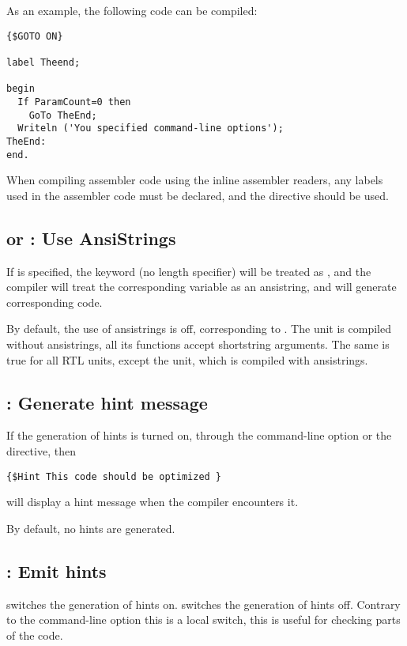 As an example, the following code can be compiled:
\begin{verbatim}
{$GOTO ON}

label Theend;

begin
  If ParamCount=0 then
    GoTo TheEnd;
  Writeln ('You specified command-line options');
TheEnd:
end.
\end{verbatim}

\begin{remark}When compiling assembler code using the inline assembler
readers, any labels used in the assembler code must be declared, and 
the  directive should be used.
\end{remark}

\subsection{ or  : Use AnsiStrings}

If  is specified, the keyword  (no
length specifier) will be treated as , and the compiler
will treat the corresponding variable as an ansistring, and will
generate corresponding code.

By default, the use of ansistrings is off, corresponding to .
The  unit is compiled without ansistrings, all its functions accept
shortstring arguments. The same is true for all RTL units, except the
 unit, which is compiled with ansistrings.

\subsection{ : Generate hint message}

If the generation of hints is turned on, through the  command-line
option or the  directive, then
\begin{verbatim}
{$Hint This code should be optimized }
\end{verbatim}
will display a hint message when the compiler encounters it.

By default, no hints are generated.

\subsection{ : Emit hints}

 switches the generation of hints on.
 switches the generation of hints off.
Contrary to the command-line option  this is a local switch,
this is useful for checking parts of the code.

